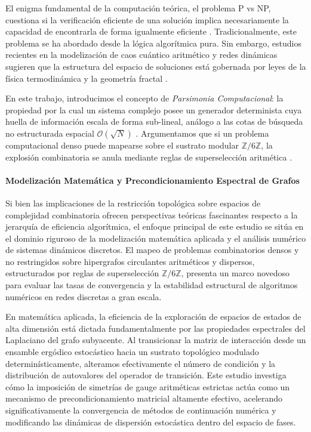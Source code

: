 \documentclass[sn-mathphys]{sn-jnl}
\newcommand{\Zmod}{\mathbb{Z}/6\mathbb{Z}}
\begin{document}
El enigma fundamental de la computación teórica, el problema P vs NP, cuestiona si la verificación eficiente de una solución implica necesariamente la capacidad de encontrarla de forma igualmente eficiente \cite{Karp1972}. Tradicionalmente, este problema se ha abordado desde la lógica algorítmica pura. Sin embargo, estudios recientes en la modelización de caos cuántico aritmético y redes dinámicas sugieren que la estructura del espacio de soluciones está gobernada por leyes de la física termodinámica y la geometría fractal \cite{Srednicki1994, Mehta2004}.

En este trabajo, introducimos el concepto de \textit{Parsimonia Computacional}: la propiedad por la cual un sistema complejo posee un generador determinista cuya huella de información escala de forma sub-lineal, análogo a las cotas de búsqueda no estructurada espacial $\mathcal{O}(\sqrt{N})$ \cite{Grover1996}. Argumentamos que si un problema computacional denso puede mapearse sobre el sustrato modular $\Zmod$, la explosión combinatoria se anula mediante reglas de superselección aritmética \cite{Connes2008, Sarnak1995}.

\paragraph{Modelización Matemática y Precondicionamiento Espectral de Grafos}
Si bien las implicaciones de la restricción topológica sobre espacios de complejidad combinatoria ofrecen perspectivas teóricas fascinantes respecto a la jerarquía de eficiencia algorítmica, el enfoque principal de este estudio se sitúa en el dominio riguroso de la modelización matemática aplicada y el análisis numérico de sistemas dinámicos discretos. El mapeo de problemas combinatorios densos y no restringidos sobre hipergrafos circulantes aritméticos y dispersos, estructurados por reglas de superselección $\Zmod$, presenta un marco novedoso para evaluar las tasas de convergencia y la estabilidad estructural de algoritmos numéricos en redes discretas a gran escala.

En matemática aplicada, la eficiencia de la exploración de espacios de estados de alta dimensión está dictada fundamentalmente por las propiedades espectrales del Laplaciano del grafo subyacente. Al transicionar la matriz de interacción desde un ensamble ergódico estocástico hacia un sustrato topológico modulado determinísticamente, alteramos efectivamente el número de condición y la distribución de autovalores del operador de transición. Este estudio investiga cómo la imposición de simetrías de gauge aritméticas estrictas actúa como un mecanismo de precondicionamiento matricial altamente efectivo, acelerando significativamente la convergencia de métodos de continuación numérica y modificando las dinámicas de dispersión estocástica dentro del espacio de fases. 
\end{document}
